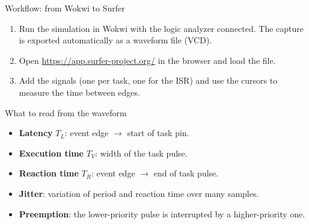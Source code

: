 \begin{frame}{Workflow: from Wokwi to Surfer}
  \begin{enumerate}
    \item Run the simulation in Wokwi with the logic analyzer connected. The capture is exported automatically as a waveform file (VCD).
    \item Open \url{https://app.surfer-project.org/} in the browser and load the file.
    \item Add the signals (one per task, one for the ISR) and use the cursors to measure the time between edges.
  \end{enumerate}
\end{frame}


\begin{frame}{What to read from the waveform}
  \begin{itemize}
    \item \textbf{Latency} $T_L$: event edge $\rightarrow$ start of task pin.
    \item \textbf{Execution time} $T_V$: width of the task pulse.
    \item \textbf{Reaction time} $T_R$: event edge $\rightarrow$ end of task pulse.
    \item \textbf{Jitter}: variation of period and reaction time over many samples.
    \item \textbf{Preemption}: the lower-priority pulse is interrupted by a higher-priority one.
  \end{itemize}
\end{frame}
